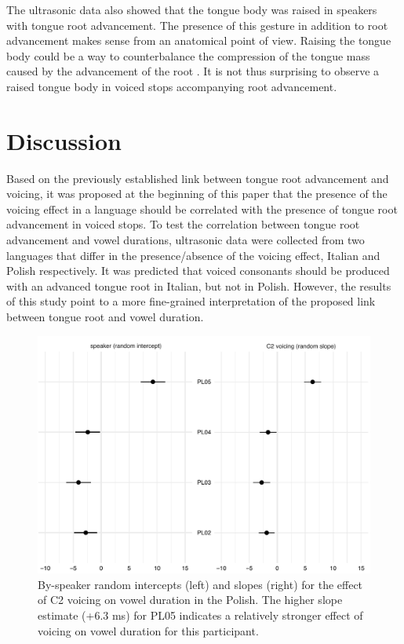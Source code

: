 \documentclass[authoryear, twocolumn]{elsarticle}
\begin{document}
The ultrasonic data also showed that the tongue body was raised in
speakers with tongue root advancement. The presence of this gesture in
addition to root advancement makes sense from an anatomical point of
view. Raising the tongue body could be a way to counterbalance the
compression of the tongue mass caused by the advancement of the root
\citep{perkell1969, jackson1988, kingston1997, fulop1998}. It is not
thus surprising to observe a raised tongue body in voiced stops
accompanying root advancement.

\section{Discussion}\label{discussion}

\label{s:discussion}

Based on the previously established link between tongue root advancement
and voicing, it was proposed at the beginning of this paper that the
presence of the voicing effect in a language should be correlated with
the presence of tongue root advancement in voiced stops. To test the
correlation between tongue root advancement and vowel durations,
ultrasonic data were collected from two languages that differ in the
presence/absence of the voicing effect, Italian and Polish respectively.
It was predicted that voiced consonants should be produced with an
advanced tongue root in Italian, but not in Polish. However, the results
of this study point to a more fine-grained interpretation of the
proposed link between tongue root and vowel duration.

\begin{figure}
    \centering
    \includegraphics[height=.35\textwidth]{fig/polish-re.pdf}
    \caption{By-speaker random intercepts (left) and slopes (right) for the effect of C2 voicing on vowel duration in the Polish. The higher slope estimate (+6.3 ms) for PL05 indicates a relatively stronger effect of voicing on vowel duration for this participant.}
    \label{f:polish-re}
\end{figure}
\end{document}
